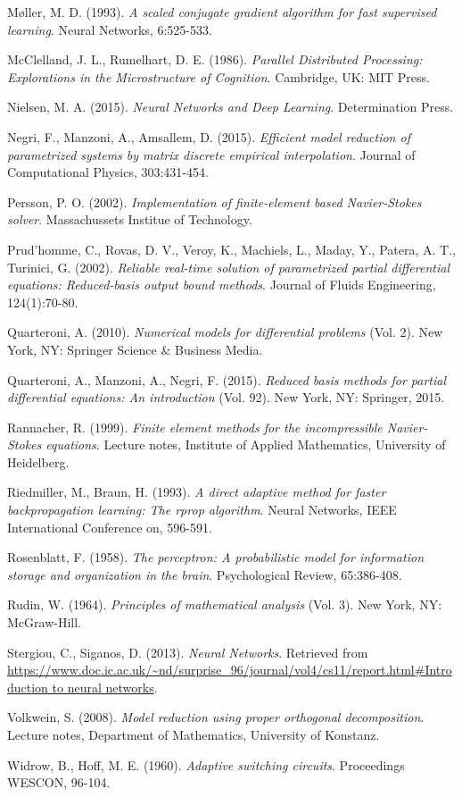 \documentclass[12pt, a4paper, twoside, openright, notitlepage]{report}
\numberwithin{equation}{chapter}
\theoremstyle{theorem}
\theoremstyle{definition}
\theoremstyle{remark}
\theoremstyle{proposition}
\numberwithin{figure}{chapter}
\begin{document}
\begin{thebibliography}{50}
		M\o{}ller, M. D. (1993). \emph{A scaled conjugate gradient algorithm for fast supervised learning}. Neural Networks, 6:525-533.
						
		McClelland, J. L., Rumelhart, D. E. (1986). \emph{Parallel Distributed Processing: Explorations in the Microstructure of Cognition}. Cambridge, UK: MIT Press.
		
		Nielsen, M. A. (2015). \emph{Neural Networks and Deep Learning}. Determination Press.
				
		Negri, F., Manzoni, A., Amsallem, D. (2015). \emph{Efficient model reduction of parametrized systems by matrix discrete empirical interpolation}. Journal of Computational Physics, 303:431-454.
		
		Persson, P. O. (2002). \emph{Implementation of finite-element based Navier-Stokes solver}. Massachussets Institue of Technology.
		
		Prud'homme, C., Rovas, D. V., Veroy, K., Machiels, L., Maday, Y., Patera, A. T., Turinici, G. (2002). \emph{Reliable real-time solution of parametrized partial differential equations: Reduced-basis output bound methods}. Journal of Fluids Engineering, 124(1):70-80.
		
		Quarteroni, A. (2010). \emph{Numerical models for differential problems} (Vol. 2). New York, NY: Springer Science \& Business Media.
		
		Quarteroni, A., Manzoni, A., Negri, F. (2015). \emph{Reduced basis methods for partial differential equations: An introduction} (Vol. 92). New York, NY: Springer, 2015.
		
		Rannacher, R. (1999). \emph{Finite element methods for the incompressible Navier-Stokes equations}. Lecture notes, Institute of Applied Mathematics, University of Heidelberg.
		
		Riedmiller, M., Braun, H. (1993). \emph{A direct adaptive method for faster backpropagation learning: The rprop algorithm}. Neural Networks, IEEE International Conference on, 596-591.
		
		Rosenblatt, F. (1958). \emph{The perceptron: A probabilistic model for information storage and organization in the brain}. Psychological Review, 65:386-408.
		
		Rudin, W. (1964). \emph{Principles of mathematical analysis} (Vol. 3). New York, NY: McGraw-Hill.
		
		Stergiou, C., Siganos, D. (2013). \emph{Neural Networks}. Retrieved from \url{https://www.doc.ic.ac.uk/~nd/surprise_96/journal/vol4/cs11/report.html#Introduction to neural networks}.
		
		Volkwein, S. (2008). \emph{Model reduction using proper orthogonal decomposition}. Lecture notes, Department of Mathematics, University of Konstanz.
		
		Widrow, B., Hoff, M. E. (1960). \emph{Adaptive switching circuits}. Proceedings WESCON, 96-104.
		
	\end{thebibliography}	
	
\end{document}
